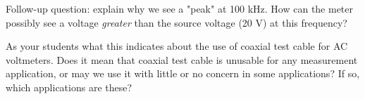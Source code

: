 \vskip 10pt

Follow-up question: explain why we see a "peak" at 100 kHz.  How can the meter possibly see a voltage {\it greater} than the source voltage (20 V) at this frequency?







As your students what this indicates about the use of coaxial test cable for AC voltmeters.  Does it mean that coaxial test cable is unusable for any measurement application, or may we use it with little or no concern in some applications?  If so, which applications are these?




